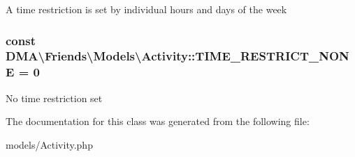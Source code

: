 A time restriction is set by individual hours and days of the week \hypertarget{classDMA_1_1Friends_1_1Models_1_1Activity_ab9dd8b18c4810beabdcf8e45039913c8}{
\subsubsection[{T\+I\+M\+E\+\_\+\+R\+E\+S\+T\+R\+I\+C\+T\+\_\+\+N\+O\+N\+E}]{\setlength{\rightskip}{0pt plus 5cm}const D\+M\+A\textbackslash{}\+Friends\textbackslash{}\+Models\textbackslash{}\+Activity\+::\+T\+I\+M\+E\+\_\+\+R\+E\+S\+T\+R\+I\+C\+T\+\_\+\+N\+O\+N\+E = 0}}\label{classDMA_1_1Friends_1_1Models_1_1Activity_ab9dd8b18c4810beabdcf8e45039913c8}
No time restriction set 

The documentation for this class was generated from the following file\+:\begin{DoxyCompactItemize}
\item 
models/Activity.\+php\end{DoxyCompactItemize}
